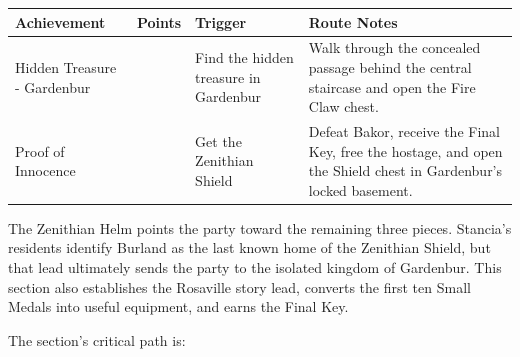 \documentclass[
  american,
  10pt,
  letterpaper,
  oneside,
  open=any]{scrreprt}
\newcounter{none} %
\newenvironment{guidetable}{%
  \small\setstretch{1.0}%
  \setlength{\tabcolsep}{4pt}%
  \setlength{\LTpre}{8pt}\setlength{\LTpost}{10pt}%
  \renewcommand{\arraystretch}{1.16}%
}{ }
\begin{document}
\begin{guidetable}

{\def\LTcaptype{none} %
\begin{longtable}[]{@{}
  >{\raggedright\arraybackslash}p{}
  >{\raggedleft\arraybackslash}p{}
  >{\raggedright\arraybackslash}p{}
  >{\raggedright\arraybackslash}p{}@{}}
\toprule\noalign{}
\begin{minipage}[b]{\linewidth}\raggedright
\color{GuideGreen}\bfseries Achievement
\end{minipage} & \begin{minipage}[b]{\linewidth}\raggedleft
\color{GuideGreen}\bfseries Points
\end{minipage} & \begin{minipage}[b]{\linewidth}\raggedright
\color{GuideGreen}\bfseries Trigger
\end{minipage} & \begin{minipage}[b]{\linewidth}\raggedright
\color{GuideGreen}\bfseries Route Notes
\end{minipage} \\
\midrule\noalign{}
\endhead
\bottomrule\noalign{}
\endlastfoot
Hidden Treasure - Gardenbur & 5 & Find the hidden treasure in Gardenbur
& Walk through the concealed passage behind the central staircase and
open the Fire Claw chest. \\
Proof of Innocence & 5 & Get the Zenithian Shield & Defeat Bakor,
receive the Final Key, free the hostage, and open the Shield chest in
Gardenbur's locked basement. \\
\end{longtable}
}

\end{guidetable}

The Zenithian Helm points the party toward the remaining three pieces.
Stancia's residents identify Burland as the last known home of the
Zenithian Shield, but that lead ultimately sends the party to the
isolated kingdom of Gardenbur. This section also establishes the
Rosaville story lead, converts the first ten Small Medals into useful
equipment, and earns the Final Key.

The section's critical path is:
\end{document}
